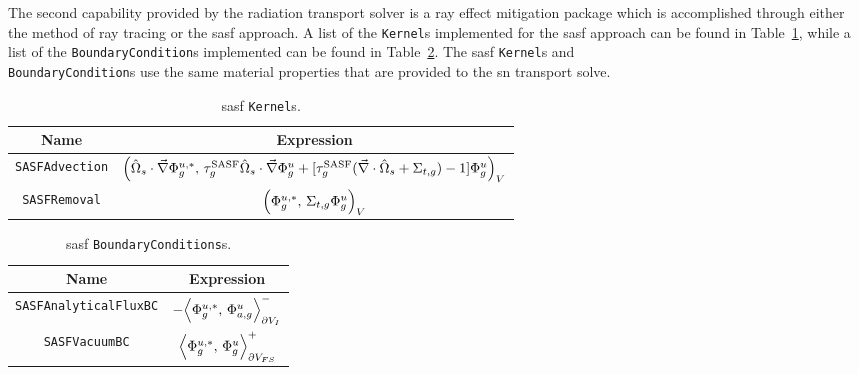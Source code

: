 The second capability provided by the radiation transport solver is a ray effect mitigation package which is accomplished through either the method of ray tracing or the \acrshort{sasf} approach. A list of the \texttt{Kernel}s implemented for the \acrshort{sasf} approach can be found in Table~\ref{table:sasf_kernels}, while a list of the \texttt{BoundaryCondition}s implemented can be found in Table~\ref{table:sasf_bcs}. The \acrshort{sasf} \texttt{Kernel}s and \\\texttt{BoundaryCondition}s use the same material properties that are provided to the \acrshort{sn} transport solve. 
\begin{table}[H]
    \centering
    \caption{\acrshort{sasf} \texttt{Kernel}s.}
    \begin{tabular}{|c|c|}
        \hline
        \textbf{Name} & \textbf{Expression}\\
        \hline
        \texttt{SASFAdvection} & $\Bigl(\hat{\Omega}_{s}\cdot\vec{\nabla}\Phi^{u,*}_{g},\,\tau^{\text{SASF}}_{g}\hat{\Omega}_{s}\cdot\vec{\nabla}\Phi^{u}_{g} + [\tau^{\text{SASF}}_{g}(\vec{\nabla}\cdot\hat{\Omega}_{s} + \Sigma_{t,g}) - 1]\Phi^{u}_{g}\Bigr)_{V}$  \\
        \texttt{SASFRemoval} & $\Bigl(\Phi^{u,*}_{g},\,\Sigma_{t,g}\Phi^{u}_{g}\Bigr)_{V}$  \\
        \hline
    \end{tabular}
    \label{table:sasf_kernels}
\end{table}
\begin{table}[H]
    \centering
    \caption{\acrshort{sasf} \texttt{BoundaryConditions}s.}
    \begin{tabular}{|c|c|}
        \hline
        \textbf{Name} & \textbf{Expression}\\
        \hline
        \texttt{SASFAnalyticalFluxBC} & $-\Bigl\langle\Phi^{u,*}_{g},\,\Phi^{u}_{a,g}\Bigr\rangle^{-}_{\partial V_{I}}$ \\
        \texttt{SASFVacuumBC} & $\Bigl\langle\Phi^{u,*}_{g},\,\Phi^{u}_{g}\Bigr\rangle^{+}_{\partial V_{FS}}$ \\
        \hline
    \end{tabular}
    \label{table:sasf_bcs}
\end{table}

